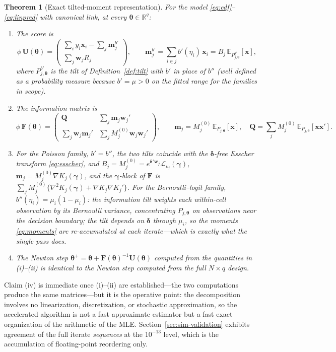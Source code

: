 \documentclass[11pt]{article}
\newtheorem{theorem}{Theorem}
\newcommand{\R}{\mathbb{R}}
\newcommand{\E}{\mathbb{E}}
\newcommand{\bgamma}{\bm{\gamma}}
\newcommand{\bdelta}{\bm{\delta}}
\newcommand{\btheta}{\bm{\theta}}
\newcommand{\bx}{\mathbf{x}}
\newcommand{\bw}{\mathbf{w}}
\newcommand{\bQ}{\mathbf{Q}}
\newcommand{\bF}{\mathbf{F}}
\newcommand{\bU}{\mathbf{U}}
\begin{document}
\begin{theorem}[Exact tilted-moment representation]\label{thm:tilted}
For the model \eqref{eq:edf}--\eqref{eq:linpred} with canonical link, at
every $\btheta \in \R^q$:
\begin{enumerate}
\item[(i)] The score is
\[
\phi\, \bU(\btheta) =
\begin{pmatrix}
\sum_{i} y_i \bx_i - \sum_{j} \mathbf{m}^{b'}_j \\[2pt]
\sum_{j} \bw_j R_j
\end{pmatrix},
\qquad
\mathbf{m}^{b'}_j = \sum_{i \in j} b'(\eta_i)\,\bx_i
  = B_j\, \E_{P^{b'}_{j,\btheta}}[\bx],
\]
where $P^{b'}_{j,\btheta}$ is the tilt of Definition~\ref{def:tilt} with
$b'$ in place of $b''$ (well defined as a probability measure because
$b' = \mu > 0$ on the fitted range for the families in scope).
\item[(ii)] The information matrix is
\[
\phi\, \bF(\btheta) =
\begin{pmatrix}
\bQ & \sum_j \mathbf{m}_j \bw_j' \\[2pt]
\sum_j \bw_j \mathbf{m}_j' & \sum_j M_j^{(0)} \bw_j \bw_j'
\end{pmatrix},
\qquad
\mathbf{m}_j = M_j^{(0)}\, \E_{P_{j,\btheta}}[\bx],
\quad
\bQ = \sum_j M_j^{(0)}\, \E_{P_{j,\btheta}}[\bx\bx'] .
\]
\item[(iii)] For the Poisson family, $b' = b''$, the two tilts coincide
with the $\bdelta$-free Esscher transform \eqref{eq:esscher}, and
$B_j = M_j^{(0)} = e^{\bdelta'\bw_j} \mathcal{L}_{\nu_j}(\bgamma)$,
$\mathbf{m}_j = M_j^{(0)} \nabla K_j(\bgamma)$,
and the $\bgamma$-block of $\bF$ is
$\sum_j M_j^{(0)} \{ \nabla^2 K_j(\bgamma) + \nabla K_j \nabla K_j' \}$.
For the Bernoulli--logit family, $b''(\eta_i) = \mu_i(1 - \mu_i)$: the
information tilt weights each within-cell observation by its Bernoulli
variance, concentrating $P_{j,\btheta}$ on observations near the
decision boundary; the tilt depends on $\bdelta$ through $\mu_i$, so the
moments \eqref{eq:moments} are re-accumulated at each iterate---which is
exactly what the single pass does.
\item[(iv)] The Newton step
$\btheta^{+} = \btheta + \bF(\btheta)^{-1} \bU(\btheta)$ computed from the
quantities in (i)--(ii) is identical to the Newton step computed from the
full $N \times q$ design.
\end{enumerate}
\end{theorem}

Claim (iv) is immediate once (i)--(ii) are established---the two
computations produce the same matrices---but it is the operative point:
the decomposition involves no linearization, discretization, or
stochastic approximation, so the accelerated algorithm is not a fast
approximate estimator but a fast exact organization of the arithmetic of
the MLE.  Section~\ref{sec:sim-validation} exhibits agreement of the full
iterate \emph{sequences} at the $10^{-13}$ level, which is the accumulation
of floating-point reordering only.
\end{document}
